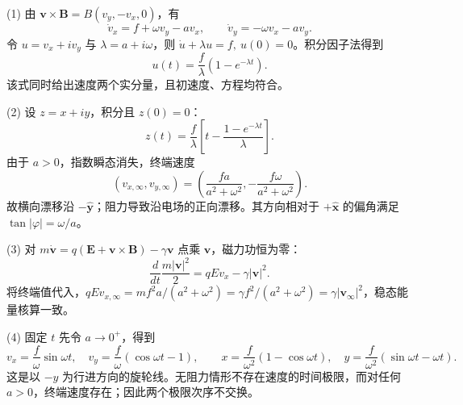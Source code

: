 (1) 由 \(\boldsymbol v\times\boldsymbol B=B(v_y,-v_x,0)\)，有
\[
\dot v_x=f+\omega v_y-a v_x,\qquad \dot v_y=-\omega v_x-a v_y.
\]
令 \(u=v_x+i v_y\) 与 \(\lambda=a+i\omega\)，则 \(\dot u+\lambda u=f,\ u(0)=0\)。积分因子法得到
\[
u(t)=\frac{f}{\lambda}(1-e^{-\lambda t}).
\]
该式同时给出速度两个实分量，且初速度、方程均符合。

(2) 设 \(z=x+i y\)，积分且 \(z(0)=0\)：
\[
z(t)=\frac{f}{\lambda}\left[t-\frac{1-e^{-\lambda t}}{\lambda}\right].
\]
由于 \(a>0\)，指数瞬态消失，终端速度
\[
(v_{x,\infty},v_{y,\infty})=\left(\frac{fa}{a^2+\omega^2},-\frac{f\omega}{a^2+\omega^2}\right).
\]
故横向漂移沿 \(-\hat{\boldsymbol y}\)；阻力导致沿电场的正向漂移。其方向相对于 \(+\hat{\boldsymbol x}\) 的偏角满足 \(\tan|\varphi|=\omega/a\)。

(3) 对 \(m\dot{\boldsymbol v}=q(\boldsymbol E+\boldsymbol v\times\boldsymbol B)-\gamma\boldsymbol v\) 点乘 \(\boldsymbol v\)，磁力功恒为零：
\[
\frac{d}{dt}\frac{m|\boldsymbol v|^2}{2}=qEv_x-\gamma|\boldsymbol v|^2.
\]
将终端值代入，\(qEv_{x,\infty}=mf^2 a/(a^2+\omega^2)=\gamma f^2/(a^2+\omega^2)=\gamma|\boldsymbol v_\infty|^2\)，稳态能量核算一致。

(4) 固定 \(t\) 先令 \(a\to0^+\)，得到
\[
v_x=\frac f\omega\sin\omega t,\quad v_y=\frac f\omega(\cos\omega t-1),\qquad
x=\frac f{\omega^2}(1-\cos\omega t),\quad y=\frac f{\omega^2}(\sin\omega t-\omega t).
\]
这是以 \(-y\) 为行进方向的旋轮线。无阻力情形不存在速度的时间极限，而对任何 \(a>0\)，终端速度存在；因此两个极限次序不交换。
